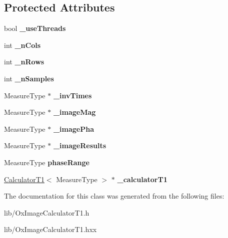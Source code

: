 \subsection*{Protected Attributes}
\begin{DoxyCompactItemize}
\item 
\hypertarget{class_ox_1_1_image_calculator_t1_af5f6e72b63b78a87a3723f4f2d71068f}{bool {\bfseries \-\_\-use\-Threads}}\label{class_ox_1_1_image_calculator_t1_af5f6e72b63b78a87a3723f4f2d71068f}

\item 
\hypertarget{class_ox_1_1_image_calculator_t1_a02ee85ff0ffd7cb5b1de9357ab23ce56}{int {\bfseries \-\_\-n\-Cols}}\label{class_ox_1_1_image_calculator_t1_a02ee85ff0ffd7cb5b1de9357ab23ce56}

\item 
\hypertarget{class_ox_1_1_image_calculator_t1_ab3db79a49b848f1a145e6fcbb9c29766}{int {\bfseries \-\_\-n\-Rows}}\label{class_ox_1_1_image_calculator_t1_ab3db79a49b848f1a145e6fcbb9c29766}

\item 
\hypertarget{class_ox_1_1_image_calculator_t1_af5655b9262c2634cc8b4ce0465682b0e}{int {\bfseries \-\_\-n\-Samples}}\label{class_ox_1_1_image_calculator_t1_af5655b9262c2634cc8b4ce0465682b0e}

\item 
\hypertarget{class_ox_1_1_image_calculator_t1_a6bc67b8020a51ecd2defd7ede1954b52}{Measure\-Type $\ast$ {\bfseries \-\_\-inv\-Times}}\label{class_ox_1_1_image_calculator_t1_a6bc67b8020a51ecd2defd7ede1954b52}

\item 
\hypertarget{class_ox_1_1_image_calculator_t1_ab43aaec5a7bae1246c96f366498c2130}{Measure\-Type $\ast$ {\bfseries \-\_\-image\-Mag}}\label{class_ox_1_1_image_calculator_t1_ab43aaec5a7bae1246c96f366498c2130}

\item 
\hypertarget{class_ox_1_1_image_calculator_t1_af804d044be29f0b554c68992d77f22ba}{Measure\-Type $\ast$ {\bfseries \-\_\-image\-Pha}}\label{class_ox_1_1_image_calculator_t1_af804d044be29f0b554c68992d77f22ba}

\item 
\hypertarget{class_ox_1_1_image_calculator_t1_a62bb966f944eae07d9873db02487f850}{Measure\-Type $\ast$ {\bfseries \-\_\-image\-Results}}\label{class_ox_1_1_image_calculator_t1_a62bb966f944eae07d9873db02487f850}

\item 
\hypertarget{class_ox_1_1_image_calculator_t1_a35e200233fd8e1ecdd88c8a74ae4c1d0}{Measure\-Type {\bfseries phase\-Range}}\label{class_ox_1_1_image_calculator_t1_a35e200233fd8e1ecdd88c8a74ae4c1d0}

\item 
\hypertarget{class_ox_1_1_image_calculator_t1_aaca73d6bf596da5766005c0064216b28}{\hyperlink{class_ox_1_1_calculator_t1}{Calculator\-T1}$<$ Measure\-Type $>$ $\ast$ {\bfseries \-\_\-calculator\-T1}}\label{class_ox_1_1_image_calculator_t1_aaca73d6bf596da5766005c0064216b28}

\end{DoxyCompactItemize}


The documentation for this class was generated from the following files\-:\begin{DoxyCompactItemize}
\item 
lib/Ox\-Image\-Calculator\-T1.\-h\item 
lib/Ox\-Image\-Calculator\-T1.\-hxx\end{DoxyCompactItemize}
